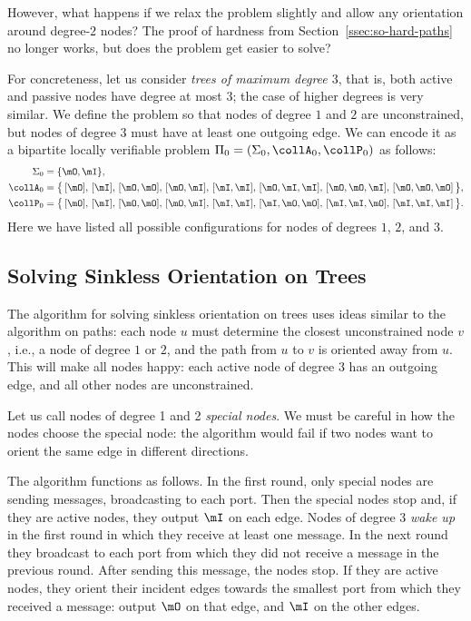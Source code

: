 However, what happens if we relax the problem slightly and allow any orientation around degree-$2$ nodes? The proof of hardness from Section~\ref{ssec:so-hard-paths} no longer works, but does the problem get easier to solve?

For concreteness, let us consider \emph{trees of maximum degree $3$}, that is, both active and passive nodes have degree at most $3$; the case of higher degrees is very similar. We define the problem so that nodes of degree $1$ and $2$ are unconstrained, but nodes of degree $3$ must have at least one outgoing edge. We can encode it as a bipartite locally verifiable problem $\Pi_0 = (\Sigma_0, \collA_0, \collP_0)$ as follows:
\begin{align*}
	\Sigma_0 &= \{ \mO, \mI \}, \\
	\collA_0 &= \bigl\{ \, [\mO],\,[\mI],\,[\mO, \mO],\,[\mO,\mI],\,[\mI,\mI],\,[\mO,\mI,\mI],\,[\mO,\mO,\mI],\,[\mO,\mO,\mO] \, \bigr\}, \\
	\collP_0 &= \bigl\{ \, [\mO],\,[\mI],\,[\mO, \mO],\,[\mO,\mI],\,[\mI,\mI],\,[\mI,\mO,\mO],\,[\mI,\mI,\mO],\,[\mI,\mI,\mI] \, \bigr\}.
\end{align*}
Here we have listed all possible configurations for nodes of degrees $1$, $2$, and $3$.

\subsection{Solving Sinkless Orientation on Trees} \label{ssec:so-trees-alg}

The algorithm for solving sinkless orientation on trees uses ideas similar to the algorithm on paths: each node $u$ must determine the closest unconstrained node $v$, i.e., a node of degree $1$ or $2$, and the path from $u$ to $v$ is oriented away from $u$. This will make all nodes happy: each active node of degree $3$ has an outgoing edge, and all other nodes are unconstrained.

Let us call nodes of degree 1 and 2 \emph{special nodes}. We must be careful in how the nodes choose the special node: the algorithm would fail if two nodes want to orient the same edge in different directions.

The algorithm functions as follows. In the first round, only special nodes are sending messages, broadcasting to each port. Then the special nodes stop and, if they are active nodes, they output $\mI$ on each edge. Nodes of degree 3 \emph{wake up} in the first round in which they receive at least one message. In the next round they broadcast to each port from which they did not receive a message in the previous round. After sending this message, the nodes stop. If they are active nodes, they orient their incident edges towards the smallest port from which they received a message: output $\mO$ on that edge, and $\mI$ on the other edges. 

